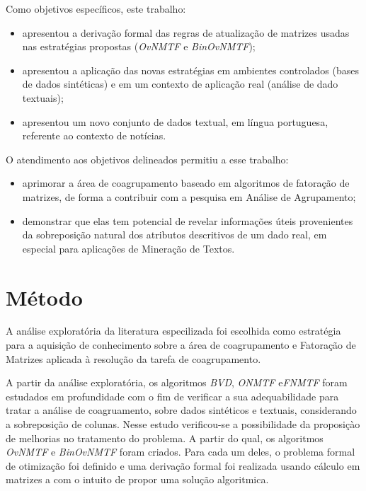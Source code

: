 \documentclass[
    12pt,                %
    oneside,            %
    a4paper,            %
    english,            %
    brazil                %
    ]{abntex2ppgsi}
\begin{document}
Como objetivos específicos, este trabalho:

\begin{itemize}
\item apresentou a derivação formal das regras de atualização de matrizes usadas nas estratégias propostas (\textit{OvNMTF} e \textit{BinOvNMTF});
\item apresentou a aplicação das novas estratégias em ambientes controlados (bases de dados sintéticas) e em um contexto de aplicação real (análise de dado textuais);
\item apresentou um novo conjunto de dados textual, em língua portuguesa, referente ao contexto de notícias.
\end{itemize}

O atendimento aos objetivos delineados permitiu a esse trabalho:

\begin{itemize}
\item aprimorar a área de coagrupamento baseado em algoritmos de fatoração de matrizes, de forma a contribuir com a pesquisa em Análise de Agrupamento;
\item demonstrar que elas tem potencial de revelar informações úteis provenientes da sobreposição natural dos atributos descritivos de um dado real, em especial para aplicações de Mineração de Textos.
\end{itemize}


\section{Método}

A análise exploratória da literatura especilizada foi escolhida como estratégia para a aquisição de conhecimento sobre a área de coagrupamento e Fatoração de Matrizes aplicada à resolução da tarefa de coagrupamento.

A partir da análise exploratória, os algoritmos \textit{BVD}, \textit{ONMTF} e\textit{FNMTF} foram estudados em profundidade com o fim de verificar a sua adequabilidade para tratar a análise de coagruamento, sobre dados sintéticos e textuais, considerando a sobreposição de colunas.
Nesse estudo verificou-se a possibilidade da proposiçào de melhorias no tratamento do problema.
A partir do qual, os algoritmos \textit{OvNMTF} e \textit{BinOvNMTF} foram criados.
Para cada um deles, o problema formal de otimização foi definido e uma derivação formal foi realizada usando cálculo em matrizes a com o intuito de propor uma solução algoritmica.
\end{document}
